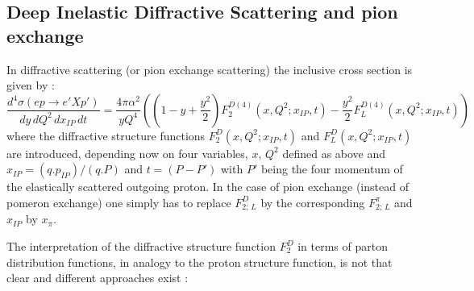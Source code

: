 \documentclass[10pt]{article} \usepackage{dina4}
\newcommand{\PO}{\ensuremath{ I\! \! P} }
\newcommand{\pom}{I\!\!P}
\newcommand{\xpom}{x_{\pom}}
\begin{document}
\subsection{Deep Inelastic Diffractive Scattering and pion exchange}
\label{sec:diff}
In diffractive scattering (or pion exchange scattering) the
inclusive cross section is given by \cite{Ingelman_Prytz}:    
\begin{equation}
\frac{d^4 \sigma (e p \to e' X p')}{dy\,dQ^2\,dx_{\PO}\,dt}
= \frac{4 \pi \alpha ^2}{y Q^4} 
   \left(   \left( 1 -  y + \frac{y^2}{2} \right) 
                F_2^{D(4)}(x,Q^2;x_{\PO},t)
                   -   \frac{y^2}{2} F_L^{D(4)}(x,Q^2;x_{\PO},t) \right)
\end{equation}
where the diffractive structure functions $F_2^D(x,Q^2;\xpom,t)$ and
$F_L^D(x,Q^2;\xpom,t)$ are introduced, depending now on four 
variables, $x$, $Q^2$ defined as above and $\xpom=(q.p_{\PO})/
(q.P)$ and $t=(P - P')$ with $P'$ being the four 
momentum of the elastically scattered outgoing proton. In the case of
pion exchange (instead of pomeron exchange) one simply has to 
replace $F_{2;\,L}^D$
 by the corresponding $F_{2;\,L}^{\pi}$ and $\xpom$ by $x_{\pi}$.
\par
The interpretation of the diffractive structure function $F_2^D$ in terms
of parton distribution functions, in analogy  to the proton 
structure function, is 
not that clear and different approaches exist \cite{diff_ws_sum}:
\end{document}
